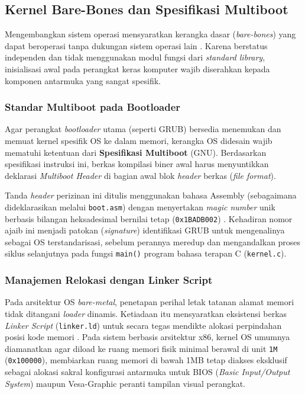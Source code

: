 \subsection{Kernel Bare-Bones dan Spesifikasi Multiboot}
Mengembangkan sistem operasi mensyaratkan kerangka dasar (\textit{bare-bones}) yang dapat beroperasi tanpa dukungan sistem operasi lain \cite{osdev_wiki_barebones}. Karena berstatus independen dan tidak menggunakan modul fungsi dari \textit{standard library}, inisialisasi awal pada perangkat keras komputer wajib diserahkan kepada komponen antarmuka yang sangat spesifik.

\subsubsection{Standar Multiboot pada Bootloader}
Agar perangkat \textit{bootloader} utama (seperti GRUB) bersedia menemukan dan memuat kernel spesifik OS ke dalam memori, kerangka OS didesain wajib mematuhi ketentuan dari \textbf{Spesifikasi Multiboot} (GNU). Berdasarkan spesifikasi instruksi ini, berkas kompilasi biner awal harus menyuntikkan deklarasi \textit{Multiboot Header} di bagian awal blok \textit{header} berkas (\textit{file format}). 

Tanda \textit{header} perizinan ini ditulis menggunakan bahasa Assembly (sebagaimana dideklarasikan melalui \texttt{boot.asm}) dengan menyertakan \textit{magic number} unik berbasis bilangan heksadesimal bernilai tetap (\texttt{0x1BADB002}) \cite{gnu_multiboot}. Kehadiran nomor ajaib ini menjadi patokan (\textit{signature}) identifikasi GRUB untuk mengenalinya sebagai OS terstandarisasi, sebelum perannya meredup dan mengandalkan proses siklus selanjutnya pada fungsi \texttt{main()} program bahasa terapan C (\texttt{kernel.c}).

\subsubsection{Manajemen Relokasi dengan Linker Script}
Pada arsitektur OS \textit{bare-metal}, penetapan perihal letak tatanan alamat memori tidak ditangani \textit{loader} dinamis. Ketiadaan itu mensyaratkan eksistensi berkas \textit{Linker Script} (\texttt{linker.ld}) untuk secara tegas mendikte alokasi perpindahan posisi kode memori \cite{bryant2015computer}. Pada sistem berbasis arsitektur x86, kernel OS umumnya diamanatkan agar diload ke ruang memori fisik minimal berawal di unit \texttt{1M} (\texttt{0x100000}), membiarkan ruang memori di bawah 1MB tetap diakses eksklusif sebagai alokasi sakral konfigurasi antarmuka untuk BIOS (\textit{Basic Input/Output System}) maupun Vesa-Graphic peranti tampilan visual perangkat.

